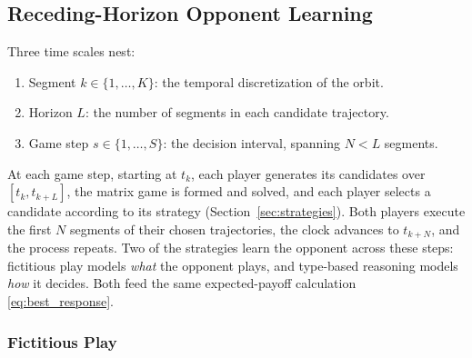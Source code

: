 \documentclass[letterpaper, 10 pt, conference]{ieeeconf}  %
\begin{document}

\subsection{Receding-Horizon Opponent Learning}

Three time scales nest:
%
\begin{enumerate}
    \item Segment $k \in \{1, \dots, K\}$: the temporal discretization of the orbit.
    \item Horizon $L$: the number of segments in each candidate trajectory.
    \item Game step $s \in \{1, \dots, S\}$: the decision interval, spanning $N < L$ segments.
\end{enumerate}
%
At each game step, starting at $t_k$, each player generates its candidates over $[t_k, t_{k+L}]$, the matrix game is formed and solved, and each player selects a candidate according to its strategy (Section~\ref{sec:strategies}). Both players execute the first $N$ segments of their chosen trajectories, the clock advances to $t_{k+N}$, and the process repeats. Two of the strategies learn the opponent across these steps: fictitious play models \emph{what} the opponent plays, and type-based reasoning models \emph{how} it decides. Both feed the same expected-payoff calculation \eqref{eq:best_response}.

\subsubsection{Fictitious Play}
\end{document}

